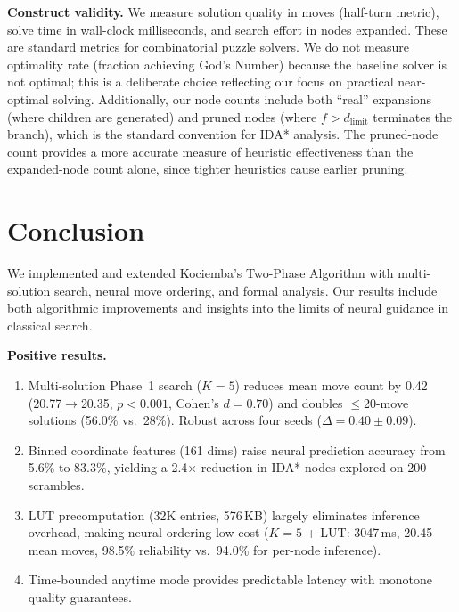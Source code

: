 \documentclass[conference]{IEEEtran}
\begin{document}
\textbf{Construct validity.} We measure solution quality in moves (half-turn metric), solve time in wall-clock milliseconds, and search effort in nodes expanded. These are standard metrics for combinatorial puzzle solvers. We do not measure optimality rate (fraction achieving God's Number) because the baseline solver is not optimal; this is a deliberate choice reflecting our focus on practical near-optimal solving. Additionally, our node counts include both ``real'' expansions (where children are generated) and pruned nodes (where $f > d_{\text{limit}}$ terminates the branch), which is the standard convention for IDA* analysis. The pruned-node count provides a more accurate measure of heuristic effectiveness than the expanded-node count alone, since tighter heuristics cause earlier pruning.

\FloatBarrier
\section{Conclusion}
\label{sec:conclusion}

We implemented and extended Kociemba's Two-Phase Algorithm with multi-solution search, neural move ordering, and formal analysis. Our results include both algorithmic improvements and insights into the limits of neural guidance in classical search.

\textbf{Positive results.}
\begin{enumerate}[leftmargin=*]
  \item Multi-solution Phase~1 search ($K{=}5$) reduces mean move count by 0.42 (20.77$\to$20.35, $p < 0.001$, Cohen's $d = 0.70$) and doubles $\leq$20-move solutions (56.0\% vs.\ 28\%). Robust across four seeds ($\Delta = 0.40 \pm 0.09$).
  \item Binned coordinate features (161 dims) raise neural prediction accuracy from 5.6\% to 83.3\%, yielding a 2.4$\times$ reduction in IDA* nodes explored on 200 scrambles.
  \item LUT precomputation (32K entries, 576\,KB) largely eliminates inference overhead, making neural ordering low-cost ($K{=}5$ + LUT: 3047\,ms, 20.45 mean moves, 98.5\% reliability vs.\ 94.0\% for per-node inference).
  \item Time-bounded anytime mode provides predictable latency with monotone quality guarantees.
\end{enumerate}
\end{document}
